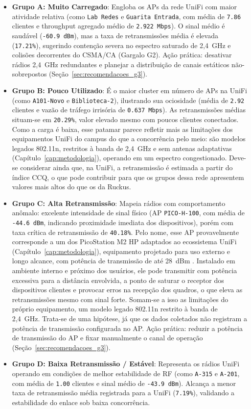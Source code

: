 \begin{itemize}
  \item \textbf{Grupo A: Muito Carregado}: Engloba os APs da rede UniFi com maior atividade relativa (como \texttt{Lab Redes} e \texttt{Guarita Entrada}, com média de \texttt{7.86} clientes e throughput agregado médio de \texttt{2.922 Mbps}). O sinal médio é saudável (\texttt{-60.9 dBm}), mas a taxa de retransmissões média é elevada (\texttt{17.21\%}), sugerindo contenção severa no espectro saturado de 2,4~GHz e colisões decorrentes do CSMA/CA (Gargalo G2). Ação prática: desativar rádios 2,4~GHz redundantes e planejar a distribuição de canais estáticos não-sobrepostos (Seção~\ref{sec:recomendacoes_g3}).
  \item \textbf{Grupo B: Pouco Utilizado}: É o maior cluster em número de APs na UniFi (como \texttt{A101-Novo} e \texttt{Biblioteca-2}), ilustrando sua ociosidade (média de \texttt{2.92} clientes e vazão de tráfego irrisória de \texttt{0.637 Mbps}). As retransmissões médias situam-se em \texttt{20.29\%}, valor elevado mesmo com poucos clientes conectados. Como a carga é baixa, esse patamar parece refletir mais as limitações dos equipamentos UniFi do campus do que a concorrência pelo meio: são modelos legados 802.11n, restritos à banda de 2,4~GHz e sem antenas adaptativas (Capítulo~\ref{cap:metodologia}), operando em um espectro congestionado. Deve-se considerar ainda que, na UniFi, a retransmissão é estimada a partir do índice CCQ, o que pode contribuir para que os grupos dessa rede apresentem valores mais altos do que os da Ruckus.
  \item \textbf{Grupo C: Alta Retransmissão}: Mapeia rádios com comportamento anômalo: excelente intensidade de sinal físico (AP \texttt{PICO-H-100}, com média de \texttt{-44.6 dBm}, indicando proximidade imediata dos dispositivos), porém com taxa crítica de retransmissão de \texttt{40.18\%}. Pelo nome, esse AP provavelmente corresponde a um dos PicoStation M2 HP adaptados ao ecossistema UniFi (Capítulo~\ref{cap:metodologia}), equipamento projetado para uso externo e longo alcance, com potência de transmissão de até 28~dBm \cite{ubiquiti_picom2hp}. Instalado em ambiente interno e próximo dos usuários, ele pode transmitir com potência excessiva para a distância envolvida, a ponto de saturar o receptor dos dispositivos clientes e provocar erros na recepção dos quadros, o que eleva as retransmissões mesmo com sinal forte. Somam-se a isso as limitações do próprio equipamento, um modelo legado 802.11n restrito à banda de 2,4~GHz. Trata-se de uma hipótese, já que os dados coletados não registram a potência de transmissão configurada no AP. Ação prática: reduzir a potência de transmissão do AP e fixar manualmente o canal de operação (Seção~\ref{sec:recomendacoes_g3}).
  \item \textbf{Grupo D: Baixa Retransmissão / Estável}: Representa os rádios UniFi operando em condições de melhor estabilidade de RF (como \texttt{A-315} e \texttt{A-201}, com média de \texttt{1.00} clientes e sinal médio de \texttt{-43.9 dBm}). Alcança a menor taxa de retransmissão média registrada para a UniFi (\texttt{7.19\%}), validando a estabilidade do enlace sob baixa concorrência.

\end{itemize}
